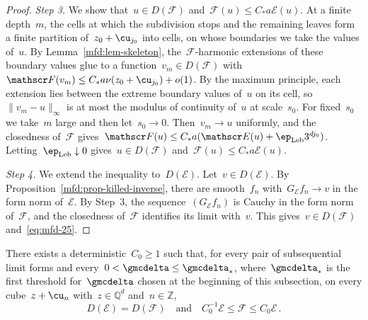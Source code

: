 \documentclass[11pt]{amsart}
\begin{document}
\begin{proof}
\emph{Step 3.} We show that~$u\in D(\mathscr F)$ and~$\mathscr F(u)\leq C_*a\mathscr E(u)$. At a finite depth~$m$, the cells at which the subdivision stops and the remaining leaves form a finite partition of~$z_0+\cu_{j_0}$ into cells, on whose boundaries we take the values of~$u$. By Lemma~\ref{mfd:lem-skeleton}, the~$\mathscr F$-harmonic extensions of these boundary values glue to a function~$v_m\in D(\mathscr F)$ with~$\mathscr F(v_m)\leq C_*a\nu(z_0+\cu_{j_0})+o(1)$. By the maximum principle, each extension lies between the extreme boundary values of~$u$ on its cell, so~$\|v_m-u\|_\infty$ is at most the modulus of continuity of~$u$ at scale~$s_0$. For fixed~$s_0$ we take~$m$ large and then let~$s_0\to0$. Then~$v_m\to u$ uniformly, and the closedness of~$\mathscr F$ gives~$\mathscr F(u)\leq C_*a(\mathscr E(u)+\ep_{\rm Leb}3^{dj_0})$. Letting~$\ep_{\rm Leb}\downarrow0$ gives~$u\in D(\mathscr F)$ and~$\mathscr F(u)\leq C_*a\mathscr E(u)$.

\smallskip

\emph{Step 4.} We extend the inequality to~$D(\mathscr E)$. Let~$v\in D(\mathscr E)$. By Proposition~\ref{mfd:prop-killed-inverse}, there are smooth~$f_n$ with~$G_{\mathscr E}f_n\to v$ in the form norm of~$\mathscr E$. By Step~3, the sequence~$(G_{\mathscr E}f_n)$ is Cauchy in the form norm of~$\mathscr F$, and the closedness of~$\mathscr F$ identifies its limit with~$v$. This gives~$v\in D(\mathscr F)$ and~\eqref{eq:mfd-25}.
\end{proof}

\begin{theorem}
\label{mfd:thm-C0}
There exists a deterministic~$C_0\geq1$ such that, for every pair of subsequential limit forms and every~$0<\gmcdelta\leq\gmcdelta_*$, where~$\gmcdelta_*$ is the first threshold for~$\gmcdelta$ chosen at the beginning of this subsection, on every cube~$z+\cu_n$ with~$z\in\mathbb Q^d$ and~$n\in\mathbb Z$,
\begin{equation}
	D(\mathscr E)=D(\mathscr F)\quad\text{and}\quad C_0^{-1}\mathscr E\leq \mathscr F\leq C_0\mathscr E\,.
	\label{eq:mfd-26}
\end{equation}
\end{theorem}
\end{document}
